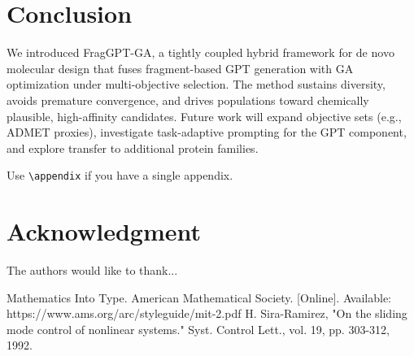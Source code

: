 \documentclass[lettersize,journal]{IEEEtran}
\begin{document}
\section{Conclusion}
We introduced FragGPT-GA, a tightly coupled hybrid framework for de novo molecular design that fuses fragment-based GPT generation with GA optimization under multi-objective selection. The method sustains diversity, avoids premature convergence, and drives populations toward chemically plausible, high-affinity candidates. Future work will expand objective sets (e.g., ADMET proxies), investigate task-adaptive prompting for the GPT component, and explore transfer to additional protein families.


Use \verb|\appendix| if you have a single appendix.

\section*{Acknowledgment}
The authors would like to thank...


% 
% 

\begin{thebibliography}{1}
Mathematics Into Type. American Mathematical Society. [Online]. Available: https://www.ams.org/arc/styleguide/mit-2.pdf
H. Sira-Ramirez, "On the sliding mode control of nonlinear systems." Syst. Control Lett., vol. 19, pp. 303-312, 1992.
\end{thebibliography}
\end{document}
